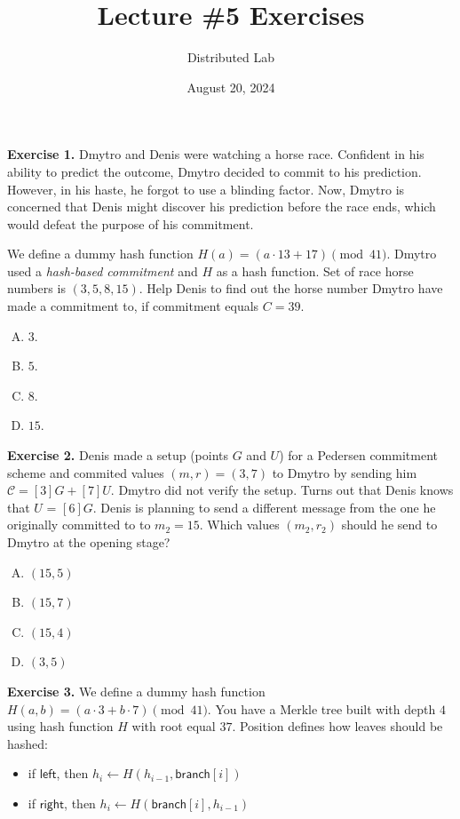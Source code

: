 \documentclass{zkdl-tests-template}
\title{\huge\sffamily\bfseries Lecture \#5 Exercises}
\author{\Large\sffamily Distributed Lab}
\date{\sffamily August 20, 2024}
\begin{document}
\pagestyle{fancy}

\maketitle

\textbf{Exercise 1.} Dmytro and Denis were watching a horse race. 
    Confident in his ability to predict the outcome, Dmytro decided to commit to his prediction. 
    However, in his haste, he forgot to use a blinding factor. 
    Now, Dmytro is concerned that Denis might discover his prediction before the race ends, 
    which would defeat the purpose of his commitment.
    
    We define a dummy hash function $H(a) = (a \cdot 13 + 17) \pmod{41}$.
    Dmytro used a \textit{hash-based commitment} and $H$ as a hash function. 
    Set of race horse numbers is $(3, 5, 8, 15)$.
    Help Denis to find out the horse number Dmytro have made a commitment to, 
    if commitment equals $C = 39$.

\begin{enumerate}[(A)]
    \item $3$.
    \item $5$.
    \item $8$.
    \item $15$.
\end{enumerate}

\textbf{Exercise 2.} Denis made a setup (points $G$ and $U$) for a Pedersen commitment scheme and commited values $(m, r) = (3, 7)$ to Dmytro
by sending him $\mathcal{C} = [3]G + [7]U$. Dmytro did not verify the setup. Turns out that Denis knows that $U$ = $[6]G$. 
Denis is planning to send a different message from the one he originally committed to
to $m_2 = 15$. Which values $(m_2, r_2)$ should he send to Dmytro at the opening stage?
\begin{enumerate}[(A)]
    \item $(15, 5)$
    \item $(15, 7)$
    \item $(15, 4)$
    \item $(3, 5)$
\end{enumerate}

\textbf{Exercise 3.} We define a dummy hash function $H(a, b) = (a \cdot 3 + b \cdot 7) \pmod{41}$. You have a Merkle tree built with depth $4$ 
using hash function $H$ with root equal $37$. Position defines how leaves should be hashed:
\begin{itemize}
    \item if $\mathsf{left}$, then $h_i \gets H(h_{i-1}, \mathsf{branch}[i])$
    \item if $\mathsf{right}$, then $h_i \gets H(\mathsf{branch}[i], h_{i-1})$
\end{itemize}
\end{document}
